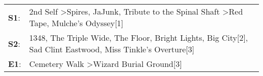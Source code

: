 \begin{supertabular}{p{0.03\textwidth}p{0.92\textwidth}}
 \textbf{S1}:  &  2nd Self\textsuperscript{} \textgreater \enspace Spires\textsuperscript{}, \enspace JaJunk\textsuperscript{}, \enspace Tribute to the Spinal Shaft\textsuperscript{} \textgreater \enspace Red Tape\textsuperscript{}, \enspace Mulche's Odyssey[1]\textsuperscript{}  \enspace  \\
 \textbf{S2}:  &   1348\textsuperscript{}, \enspace The Triple Wide\textsuperscript{}, \enspace The Floor\textsuperscript{}, \enspace Bright Lights, Big City[2]\textsuperscript{}, \enspace Sad Clint Eastwood\textsuperscript{}, \enspace Miss Tinkle's Overture[3]\textsuperscript{}  \enspace  \\
 \textbf{E1}:  &                                                                                                                                                                        Cemetery Walk\textsuperscript{} \textgreater \enspace Wizard Burial Ground[3]\textsuperscript{}  \enspace  \\
\end{supertabular}
